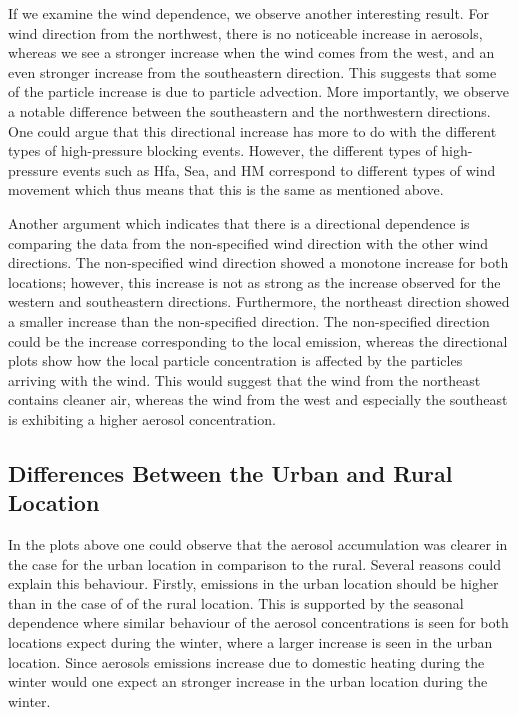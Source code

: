 If we examine the wind dependence, we observe another interesting result. For wind direction from the northwest, there is no noticeable increase in aerosols, whereas we see a stronger increase when the wind comes from the west, and an even stronger increase from the southeastern direction. This suggests that some of the particle increase is due to particle advection. More importantly, we observe a notable difference between the southeastern and the northwestern directions. One could argue that this directional increase has more to do with the different types of high-pressure blocking events. However, the different types of high-pressure events such as Hfa, Sea, and HM correspond to different types of wind movement which thus means that this is the same as mentioned above. 

Another argument which indicates that there is a directional dependence is comparing the data from the non-specified wind direction with the other wind directions. The non-specified wind direction showed a monotone increase for both locations; however, this increase is not as strong as the increase observed for the western and southeastern directions. Furthermore, the northeast direction showed a smaller increase than the non-specified direction. The non-specified direction could be the increase corresponding to the local emission, whereas the directional plots show how the local particle concentration is affected by the particles arriving with the wind. This would suggest that the wind from the northeast contains cleaner air, whereas the wind from the west and especially the southeast is exhibiting a higher aerosol concentration. 

\subsection{Differences Between the Urban and Rural Location}
In the plots above one could observe that the aerosol accumulation was clearer in the case for the urban location in comparison to the rural. Several reasons could explain this behaviour. Firstly, emissions in the urban location  should be higher than in the case of of the rural location. This is supported by the seasonal dependence where similar behaviour of the aerosol concentrations is seen for both locations expect during the winter, where a larger increase is seen in the urban location. Since aerosols emissions increase due to domestic heating during the winter would one expect an stronger increase in the urban location during the winter. 

